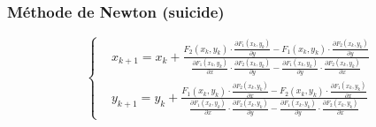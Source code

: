 \subsubsection*{Méthode de Newton (suicide)}
\noindent
\begin{equation}
    \left\{
    \begin{aligned}
         & x_{k+1} = x_k + \frac{F_2(x_k,y_k)\cdot \frac{\partial F_1(x_k, y_k)}{\partial y}-F_1(x_k,y_k)\cdot \frac{\partial F_2(x_k, y_k)}{\partial y}}{\frac{\partial F_1(x_k, y_k)}{\partial x}\cdot \frac{\partial F_2(x_k, y_k)}{\partial y}-\frac{\partial F_1(x_k, y_k)}{\partial y}\cdot \frac{\partial F_2(x_k, y_k)}{\partial x}} \\
         & y_{k+1} = y_k + \frac{F_1(x_k,y_k)\cdot \frac{\partial F_2(x_k, y_k)}{\partial x}-F_2(x_k,y_k)\cdot \frac{\partial F_1(x_k, y_k)}{\partial x}}{\frac{\partial F_1(x_k, y_k)}{\partial x}\cdot \frac{\partial F_2(x_k, y_k)}{\partial y}-\frac{\partial F_1(x_k, y_k)}{\partial y}\cdot \frac{\partial F_2(x_k, y_k)}{\partial x}}
    \end{aligned}
    \right.
    \nonumber
\end{equation}


